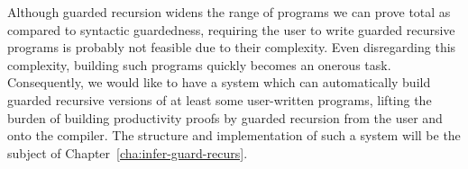 Although guarded recursion widens the range of programs we can prove total as
compared to syntactic guardedness, requiring the user to write guarded recursive
programs is probably not feasible due to their complexity. Even disregarding
this complexity, building such programs quickly becomes an onerous
task. Consequently, we would like to have a system which can automatically build
guarded recursive versions of at least some user-written programs, lifting the burden of
building productivity proofs by guarded recursion from the user and onto the
compiler. The structure and implementation of such a system will be the subject
of Chapter~\ref{cha:infer-guard-recurs}.

